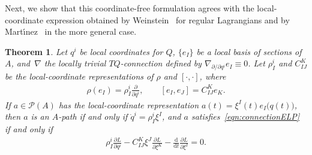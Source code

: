 \documentclass[pdftex]{sigma}
\numberwithin{equation}{section}
\newtheorem{Theorem}{Theorem}[section]
\begin{document}
Next, we show that this coordinate-free formulation agrees with the local-coordinate expression obtained by Weinstein~\cite{Weinstein1996} for regular Lagrangians and by Mart\'{\i}nez~\cite{Martinez2001,Martinez2007,Martinez2008} in the more general case.

\begin{Theorem} \label{thm:coordinateELP} Let $ q ^i $ be local coordinates for $Q$, $ \{ e _I \} $ be a local basis of sections of~$A$, and~$ \nabla $ the locally trivial $ T Q $-connection defined by $ \nabla _{ \partial / \partial q ^i } e _I \equiv 0 $. Let $ \rho ^i _I $ and $ C _{ I J } ^K $ be the local-coordinate representations of $ \rho $ and $ [\cdot , \cdot ] $, where
 \begin{gather*}
 \rho ( e _I ) = \rho ^i _I \frac{ \partial }{ \partial q ^i } , \qquad [ e _I , e _J ] = C _{ I J } ^K e _K .
 \end{gather*}
If $ a \in \mathcal{P} (A) $ has the local-coordinate representation $ a (t) = \xi ^I (t) e _I \bigl( q (t) \bigr) $, then $a$ is an $A$-path if and only if $ \dot{q} ^i = \rho ^i _I \xi ^I $, and $a$ satisfies~\eqref{eqn:connectionELP} if and only if
 \begin{gather} \label{eqn:coordinatesELP}
 \rho ^i _I \frac{ \partial L }{ \partial q ^i } - C ^K _{ I J } \xi ^J \frac{ \partial L }{ \partial \xi ^K } - \frac{\mathrm{d}}{\mathrm{d}t} \frac{ \partial L }{ \partial \xi ^I } = 0 .
 \end{gather}
\end{Theorem}
\end{document}
